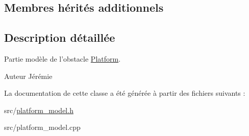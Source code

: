 \subsection*{Membres hérités additionnels}


\subsection{Description détaillée}
Partie modèle de l'obstacle \hyperlink{class_platform}{Platform}. 

\begin{DoxyAuthor}{Auteur}
Jérémie 
\end{DoxyAuthor}


La documentation de cette classe a été générée à partir des fichiers suivants \+:\begin{DoxyCompactItemize}
\item 
src/\hyperlink{platform__model_8h}{platform\+\_\+model.\+h}\item 
src/platform\+\_\+model.\+cpp\end{DoxyCompactItemize}
